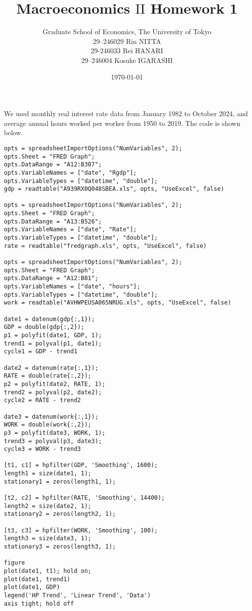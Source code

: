 \documentclass[a4paper]{article}
\title{Macroeconomics $\mathrm{II}$ Homework 1}
\date{\today}
\author{Graduate School of Economics, The University of Tokyo\\[4mm]29--246029 Rin NITTA\\ 29-246033 Rei HANARI \\ 29--246004 Kosuke IGARASHI
}
\begin{document}
\maketitle


\section{} %
We used monthly real interest rate data from January 1982 to October 2024, and average annual hours worked per worker from 1950 to 2019.
The code is shown below.

\begin{verbatim}
opts = spreadsheetImportOptions("NumVariables", 2);
opts.Sheet = "FRED Graph";
opts.DataRange = "A12:B307";
opts.VariableNames = ["date", "Rgdp"];
opts.VariableTypes = ["datetime", "double"];
gdp = readtable("A939RX0Q048SBEA.xls", opts, "UseExcel", false)

opts = spreadsheetImportOptions("NumVariables", 2);
opts.Sheet = "FRED Graph";
opts.DataRange = "A13:B526";
opts.VariableNames = ["date", "Rate"];
opts.VariableTypes = ["datetime", "double"];
rate = readtable("fredgraph.xls", opts, "UseExcel", false)

opts = spreadsheetImportOptions("NumVariables", 2);
opts.Sheet = "FRED Graph";
opts.DataRange = "A12:B81";
opts.VariableNames = ["date", "hours"];
opts.VariableTypes = ["datetime", "double"];
work = readtable("AVHWPEUSA065NRUG.xls", opts, "UseExcel", false)

date1 = datenum(gdp{:,1});
GDP = double(gdp{:,2});
p1 = polyfit(date1, GDP, 1);
trend1 = polyval(p1, date1);
cycle1 = GDP - trend1

date2 = datenum(rate{:,1});
RATE = double(rate{:,2});
p2 = polyfit(date2, RATE, 1);
trend2 = polyval(p2, date2);
cycle2 = RATE - trend2

date3 = datenum(work{:,1});
WORK = double(work{:,2});
p3 = polyfit(date3, WORK, 1);
trend3 = polyval(p3, date3);
cycle3 = WORK - trend3

[t1, c1] = hpfilter(GDP, 'Smoothing', 1600);
length1 = size(date1, 1);
stationary1 = zeros(length1, 1);

[t2, c2] = hpfilter(RATE, 'Smoothing', 14400);
length2 = size(date2, 1);
stationary2 = zeros(length2, 1);

[t3, c3] = hpfilter(WORK, 'Smoothing', 100);
length3 = size(date3, 1);
stationary3 = zeros(length3, 1);

figure
plot(date1, t1); hold on;
plot(date1, trend1)
plot(date1, GDP)
legend('HP Trend', 'Linear Trend', 'Data')
axis tight; hold off


\end{verbatim}
\end{document}
